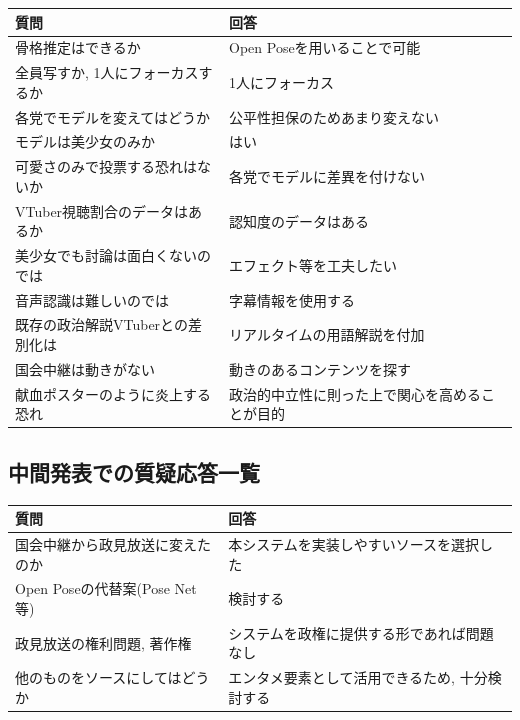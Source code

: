 \documentclass[a4paper,12pt]{jsarticle}
\begin{document}
\begin{table}[H]
	\begin{tabular}{|l|l|} \hline
		{\bf 質問} & {\bf 回答} \\ \hline \hline
		骨格推定はできるか & Open Poseを用いることで可能 \\ \hline
		全員写すか, 1人にフォーカスするか & 1人にフォーカス\\ \hline
		各党でモデルを変えてはどうか & 公平性担保のためあまり変えない\\ \hline
		モデルは美少女のみか & はい\\ \hline
		可愛さのみで投票する恐れはないか & 各党でモデルに差異を付けない\\ \hline
		VTuber視聴割合のデータはあるか & 認知度のデータはある\\ \hline
		美少女でも討論は面白くないのでは & エフェクト等を工夫したい\\ \hline
		音声認識は難しいのでは & 字幕情報を使用する\\ \hline
		既存の政治解説VTuberとの差別化は & リアルタイムの用語解説を付加\\ \hline
		国会中継は動きがない & 動きのあるコンテンツを探す\\ \hline
		献血ポスターのように炎上する恐れ & 政治的中立性に則った上で関心を高めることが目的\\ \hline
	\end{tabular}
\end{table}

\subsection{中間発表での質疑応答一覧}

\begin{table}[H]
	\begin{tabular}{|l|l|} \hline
		{\bf 質問} & {\bf 回答} \\ \hline \hline
		国会中継から政見放送に変えたのか & 本システムを実装しやすいソースを選択した\\ \hline
		Open Poseの代替案(Pose Net等) & 検討する\\ \hline
		政見放送の権利問題, 著作権 & システムを政権に提供する形であれば問題なし\\ \hline
		他のものをソースにしてはどうか & エンタメ要素として活用できるため, 十分検討する\\ \hline
	\end{tabular}
\end{table}
\end{document}
